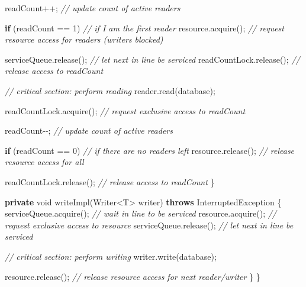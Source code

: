 \documentclass[11pt]{article}
\newenvironment{Shaded}{}{}
\newcommand{\KeywordTok}[1]{\textcolor[rgb]{0.00,0.44,0.13}{\textbf{{#1}}}}
\newcommand{\DataTypeTok}[1]{\textcolor[rgb]{0.56,0.13,0.00}{{#1}}}
\newcommand{\DecValTok}[1]{\textcolor[rgb]{0.25,0.63,0.44}{{#1}}}
\newcommand{\CommentTok}[1]{\textcolor[rgb]{0.38,0.63,0.69}{\textit{{#1}}}}
\newcommand{\FunctionTok}[1]{\textcolor[rgb]{0.02,0.16,0.49}{{#1}}}
\newcommand{\NormalTok}[1]{{#1}}
\newcommand{\ControlFlowTok}[1]{\textcolor[rgb]{0.00,0.44,0.13}{\textbf{{#1}}}}
\newcommand{\OperatorTok}[1]{\textcolor[rgb]{0.40,0.40,0.40}{{#1}}}
\newcommand{\BuiltInTok}[1]{{#1}}
\begin{document}
\begin{Shaded}
\begin{Highlighting}[]
\NormalTok{        readCount}\OperatorTok{++;} \CommentTok{// update count of active readers}

        \ControlFlowTok{if} \OperatorTok{(}\NormalTok{readCount }\OperatorTok{==} \DecValTok{1}\OperatorTok{)}     \CommentTok{// if I am the first reader}
\NormalTok{            resource}\OperatorTok{.}\FunctionTok{acquire}\OperatorTok{();} \CommentTok{// request resource access for readers (writers blocked)}

\NormalTok{        serviceQueue}\OperatorTok{.}\FunctionTok{release}\OperatorTok{();}     \CommentTok{// let next in line be serviced}
\NormalTok{        readCountLock}\OperatorTok{.}\FunctionTok{release}\OperatorTok{();}    \CommentTok{// release access to readCount}

        \CommentTok{// critical section: perform reading}
\NormalTok{        reader}\OperatorTok{.}\FunctionTok{read}\OperatorTok{(}\NormalTok{database}\OperatorTok{);}

\NormalTok{        readCountLock}\OperatorTok{.}\FunctionTok{acquire}\OperatorTok{();} \CommentTok{// request exclusive access to readCount}

\NormalTok{        readCount}\OperatorTok{{-}{-};} \CommentTok{// update count of active readers}

        \ControlFlowTok{if} \OperatorTok{(}\NormalTok{readCount }\OperatorTok{==} \DecValTok{0}\OperatorTok{)}     \CommentTok{// if there are no readers left}
\NormalTok{            resource}\OperatorTok{.}\FunctionTok{release}\OperatorTok{();} \CommentTok{// release resource access for all}

\NormalTok{        readCountLock}\OperatorTok{.}\FunctionTok{release}\OperatorTok{();} \CommentTok{// release access to readCount}
    \OperatorTok{\}}

    \KeywordTok{private} \DataTypeTok{void} \FunctionTok{writeImpl}\OperatorTok{(}\BuiltInTok{Writer}\OperatorTok{\textless{}}\NormalTok{T}\OperatorTok{\textgreater{}}\NormalTok{ writer}\OperatorTok{)} \KeywordTok{throws} \BuiltInTok{InterruptedException} \OperatorTok{\{}
\NormalTok{        serviceQueue}\OperatorTok{.}\FunctionTok{acquire}\OperatorTok{();} \CommentTok{// wait in line to be serviced}
\NormalTok{        resource}\OperatorTok{.}\FunctionTok{acquire}\OperatorTok{();}     \CommentTok{// request exclusive access to resource}
\NormalTok{        serviceQueue}\OperatorTok{.}\FunctionTok{release}\OperatorTok{();} \CommentTok{// let next in line be serviced}

        \CommentTok{// critical section: perform writing}
\NormalTok{        writer}\OperatorTok{.}\FunctionTok{write}\OperatorTok{(}\NormalTok{database}\OperatorTok{);}

\NormalTok{        resource}\OperatorTok{.}\FunctionTok{release}\OperatorTok{();}      \CommentTok{// release resource access for next reader/writer}
    \OperatorTok{\}}
\OperatorTok{\}}
\end{Highlighting}
\end{Shaded}
\end{document}
